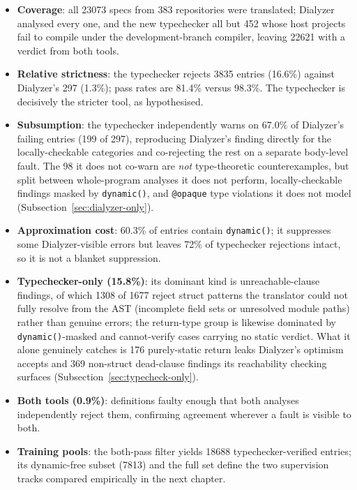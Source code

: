 \begin{itemize}
    \item \textbf{Coverage}: all \num{23073} specs from 383 repositories were translated; Dialyzer analysed every one, and the new typechecker all but 452 whose host projects fail to compile under the development-branch compiler, leaving \num{22621} with a verdict from both tools.
    \item \textbf{Relative strictness}: the typechecker rejects \num{3835} entries (16.6\%) against Dialyzer's 297 (1.3\%); pass rates are 81.4\% versus 98.3\%. The typechecker is decisively the stricter tool, as hypothesised.
    \item \textbf{Subsumption}: the typechecker independently warns on 67.0\% of Dialyzer's failing entries (199 of 297), reproducing Dialyzer's finding directly for the locally-checkable categories and co-rejecting the rest on a separate body-level fault. The 98 it does not co-warn are \emph{not} type-theoretic counterexamples, but split between whole-program analyses it does not perform, locally-checkable findings masked by \texttt{dynamic()}, and \texttt{@opaque} type violations it does not model (Subsection~\ref{sec:dialyzer-only}).
    \item \textbf{Approximation cost}: 60.3\% of entries contain \texttt{dynamic()}; it suppresses some Dialyzer-visible errors but leaves 72\% of typechecker rejections intact, so it is not a blanket suppression.
    \item \textbf{Typechecker-only (15.8\%)}: its dominant kind is unreachable-clause findings, of which \num{1308} of \num{1677} reject struct patterns the translator could not fully resolve from the AST (incomplete field sets or unresolved module paths) rather than genuine errors; the return-type group is likewise dominated by \texttt{dynamic()}-masked and cannot-verify cases carrying no static verdict. What it alone genuinely catches is 176 purely-static return leaks Dialyzer's optimism accepts and 369 non-struct dead-clause findings its reachability checking surfaces (Subsection~\ref{sec:typecheck-only}).
    \item \textbf{Both tools (0.9\%)}: definitions faulty enough that both analyses independently reject them, confirming agreement wherever a fault is visible to both.
    \item \textbf{Training pools}: the both-pass filter yields \num{18688} typechecker-verified entries; its dynamic-free subset (\num{7813}) and the full set define the two supervision tracks compared empirically in the next chapter.
\end{itemize}
